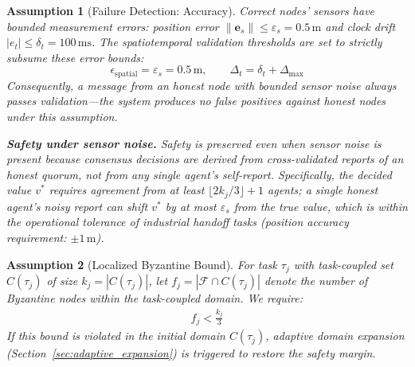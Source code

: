 \documentclass[manuscript,screen,review]{acmart}
\newtheorem{assumption}{Assumption}
\begin{document}
\begin{assumption}[Failure Detection: Accuracy]
\label{assump:sensor_accuracy}
Correct nodes' sensors have bounded measurement errors: position error $\|\mathbf{e}_s\| \leq \varepsilon_s = 0.5\,\text{m}$ and clock drift $|e_t| \leq \delta_t = 100\,\text{ms}$. The spatiotemporal validation thresholds are set to strictly subsume these error bounds:
\[
  \epsilon_{\text{spatial}} = \varepsilon_s = 0.5\,\text{m},
  \qquad
  \Delta_t = \delta_t + \Delta_{\max}
\]
Consequently, a message from an honest node with bounded sensor noise always passes validation---the system produces \emph{no false positives} against honest nodes under this assumption.

\textbf{Safety under sensor noise.} Safety is preserved even when sensor noise is present because consensus decisions are derived from cross-validated reports of an honest quorum, not from any single agent's self-report. Specifically, the decided value $v^*$ requires agreement from at least $\lfloor 2k_j/3 \rfloor + 1$ agents; a single honest agent's noisy report can shift $v^*$ by at most $\varepsilon_s$ from the true value, which is within the operational tolerance of industrial handoff tasks (position accuracy requirement: $\pm 1\,\text{m}$).
\end{assumption}

\begin{assumption}[Localized Byzantine Bound]
\label{assump:localized_bound}
For task $\tau_j$ with task-coupled set $C(\tau_j)$ of size $k_j = |C(\tau_j)|$, let $f_j = |\mathcal{F} \cap C(\tau_j)|$ denote the number of Byzantine nodes within the task-coupled domain. We require:
\begin{equation}
\begin{aligned}
f_j < \frac{k_j}{3}
\end{aligned}
\end{equation}
If this bound is violated in the initial domain $C(\tau_j)$, adaptive domain expansion (Section~\ref{sec:adaptive_expansion}) is triggered to restore the safety margin.
\end{assumption}
\end{document}
